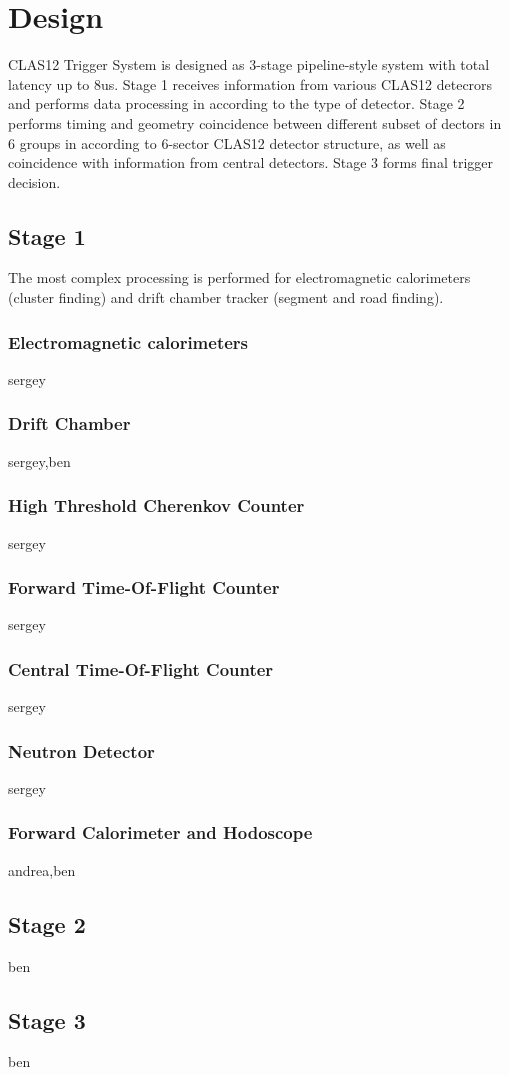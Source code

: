 \section{Design}

CLAS12 Trigger System is designed as 3-stage pipeline-style system with total latency up to 8us. Stage 1 receives information from various CLAS12 detecrors and performs data processing in according to the type of detector. Stage 2 performs timing and geometry coincidence between different subset of dectors in 6 groups in according to 6-sector CLAS12 detector structure, as well as coincidence with information from central detectors. Stage 3 forms final trigger decision.

\subsection{Stage 1} The most complex processing is performed for electromagnetic calorimeters (cluster finding) and drift chamber tracker (segment and road finding).

\subsubsection{Electromagnetic calorimeters} sergey

\subsubsection{Drift Chamber} sergey,ben

\subsubsection{High Threshold Cherenkov Counter} sergey

\subsubsection{Forward Time-Of-Flight Counter} sergey

\subsubsection{Central Time-Of-Flight Counter} sergey

\subsubsection{Neutron Detector} sergey

\subsubsection{Forward Calorimeter and Hodoscope} andrea,ben


\subsection{Stage 2} ben


\subsection{Stage 3} ben


